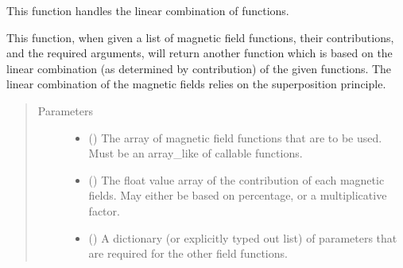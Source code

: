 \documentclass[letterpaper,10pt,english]{sphinxmanual}
\begin{document}
\begin{fulllineitems}
\label{\detokenize{magnetic_field_functions_3d:magnetic_field_functions_3d.linear_combination_magnetic_field}}
This function handles the linear combination of functions.

This function, when given a list of magnetic field functions, their contributions, and the required arguments, will return another function which is based on the linear combination (as determined by contribution) of the given functions. The linear combination of the magnetic fields relies on the superposition principle.
\begin{quote}\begin{description}
\item[{Parameters}] \leavevmode\begin{itemize}
\item {} 
 () \textendash{} The array of magnetic field functions that are to be used. Must be an
array\_like of callable functions.

\item {} 
 () \textendash{} The float value array of the contribution of each magnetic fields. May
either be based on percentage, or a multiplicative factor.

\item {} 
 () \textendash{} A dictionary (or explicitly typed out list) of parameters that are required for the other field functions.

\end{itemize}

\end{description}\end{quote}

\end{fulllineitems}

\end{document}
